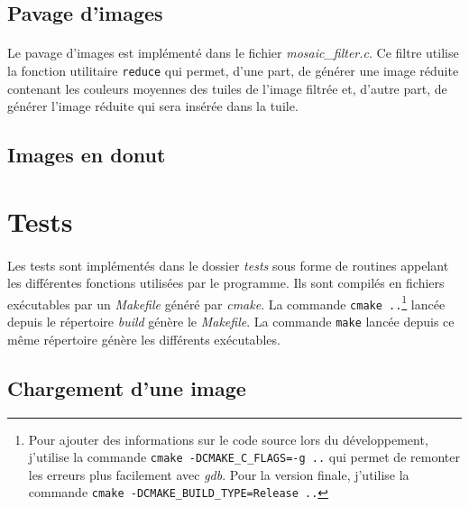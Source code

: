 \documentclass{article}
\begin{document}
    \newpage
    \subsection{Pavage d'images}
    \paragraph{}
    Le pavage d'images est implémenté dans le fichier \emph{mosaic\_filter.c}. Ce filtre utilise la fonction utilitaire \texttt{reduce} qui permet, d'une part, de générer une image réduite contenant les couleurs moyennes des tuiles de l'image filtrée et, d'autre part, de générer l'image réduite qui sera insérée dans la tuile.

    \paragraph{}
    


    \subsection{Images en donut}




    \newpage
    \section{Tests}
    \paragraph{}
    Les tests sont implémentés dans le dossier \emph{tests} sous forme de routines appelant les différentes fonctions utilisées par le programme. Ils sont compilés en fichiers exécutables par un \emph{Makefile} généré par \emph{cmake}. La commande \texttt{cmake ..}\footnote{Pour ajouter des informations sur le code source lors du développement, j'utilise la commande \texttt{cmake -DCMAKE\_C\_FLAGS=-g ..} qui permet de remonter les erreurs plus facilement avec \emph{gdb}. Pour la version finale, j'utilise la commande \texttt{cmake -DCMAKE\_BUILD\_TYPE=Release ..}} lancée depuis le répertoire \emph{build} génère le \emph{Makefile}. La commande \texttt{make} lancée depuis ce même répertoire génère les différents exécutables.


    \subsection{Chargement d'une image}
\end{document}
